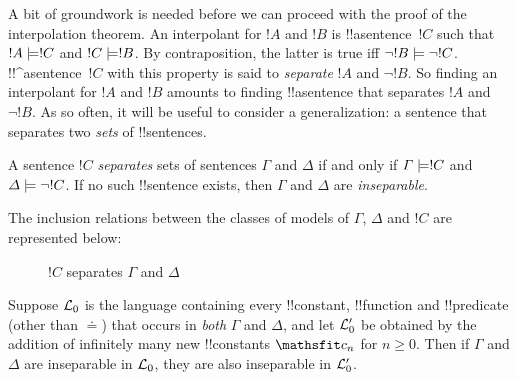 \documentclass[../../include/open-logic-section]{subfiles}
\begin{document}


A bit of groundwork is needed before we can proceed with the proof of
the interpolation theorem. An interpolant for $!A$ and $!B$ is
!!a{sentence}~$!C$ such that $!A \Entails !C$ and $!C \Entails !B$.
By contraposition, the latter is true iff $\lnot !B \Entails \lnot
!C$. !!^a{sentence}~$!C$ with this property is said to \emph{separate}
$!A$ and $\lnot !B$.  So finding an interpolant for $!A$ and $!B$
amounts to finding !!a{sentence} that separates $!A$ and $\lnot !B$.
As so often, it will be useful to consider a generalization: a
sentence that separates two \emph{sets} of !!{sentence}s.

\begin{defn}
A sentence $!C$ \emph{separates} sets of sentences $\Gamma$ and
$\Delta$ if and only if $\Gamma \Entails !C$ and $\Delta \Entails
\lnot !C$. If no such !!{sentence} exists, then $\Gamma$ and $\Delta$
are \emph{inseparable}.
\end{defn}

The inclusion relations between the classes of
models of $\Gamma$, $\Delta$ and $!C$ are represented below:
\begin{figure}[h]
  \centering
  \caption{$!C$ separates $\Gamma$ and $\Delta$}
\end{figure}


\begin{lem}
Suppose $\mathcal L_0$ is the language containing every !!{constant},
!!{function} and !!{predicate} (other than $\doteq$) that occurs in
\emph{both} $\Gamma$ and $\Delta$, and let $\mathcal L'_0$ be obtained
by the addition of infinitely many new !!{constant}s $\Obj c_n$ for $n
\ge 0$. Then if $\Gamma$ and $\Delta$ are inseparable in $\mathcal L_0$,
they are also inseparable in $\mathcal L'_0$.
\end{lem}
\end{document}
